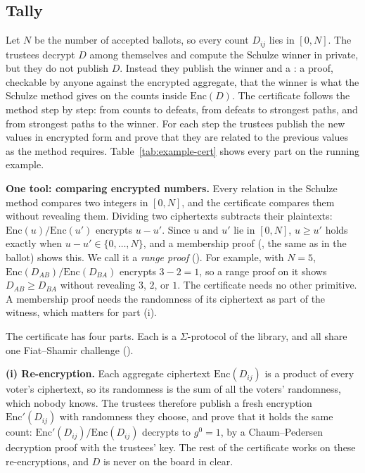 \subsection{Tally}\label{sec:tally}
Let $N$ be the number of accepted ballots, so every count $D_{ij}$ lies
in $[0, N]$. The trustees decrypt $D$ among themselves and compute the
Schulze winner in private, but they do not publish $D$. Instead they
publish the winner and a : a proof,
checkable by anyone against the encrypted aggregate, that the winner is
what the Schulze method gives on the counts inside $\mathrm{Enc}(D)$. The
certificate follows the method step by step: from counts to defeats,
from defeats to strongest paths, and from strongest paths to the winner.
For each step the trustees publish the new values in encrypted form and
prove that they are related to the previous values as the method
requires. Table~\ref{tab:example-cert} shows every part on the running
example.

\textbf{One tool: comparing encrypted numbers.} Every relation in the
Schulze method compares two integers in $[0, N]$, and the certificate
compares them without revealing them. Dividing two ciphertexts subtracts
their plaintexts: $\mathrm{Enc}(u) / \mathrm{Enc}(u')$ encrypts $u - u'$.
Since $u$ and $u'$ lie in $[0, N]$, $u \ge u'$ holds exactly when $u - u'
\in \{0, \ldots, N\}$, and a membership proof
(, the same as in the ballot)
shows this. We call it a \emph{range proof} (). For
example, with $N = 5$, $\mathrm{Enc}(D_{AB}) / \mathrm{Enc}(D_{BA})$
encrypts $3 - 2 = 1$, so a range proof on it shows $D_{AB} \ge D_{BA}$
without revealing $3$, $2$, or $1$. The certificate needs no other
primitive. A membership proof needs the randomness of its ciphertext as
part of the witness, which matters for part (i).

The certificate has four parts. Each is a $\Sigma$-protocol of the
library, and all share one Fiat--Shamir challenge
().

\textbf{(i) Re-encryption.} Each aggregate ciphertext
$\mathrm{Enc}(D_{ij})$ is a product of every voter's ciphertext, so its
randomness is the sum of all the voters' randomness, which nobody knows.
The trustees therefore publish a fresh encryption $\mathrm{Enc}'(D_{ij})$
with randomness they choose, and prove that it holds the same count:
$\mathrm{Enc}'(D_{ij}) / \mathrm{Enc}(D_{ij})$ decrypts to $g^0 = 1$, by
a Chaum--Pedersen decryption proof with the trustees' key. The rest of
the certificate works on these re-encryptions, and $D$ is never on the
board in clear.

